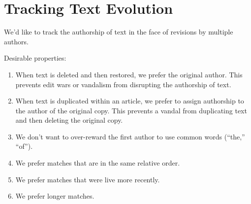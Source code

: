 \section{Tracking Text Evolution}

We'd like to track the authorship of text in the face of revisions
by multiple authors.

Desirable properties:
\begin{enumerate}
\item When text is deleted and then restored, we prefer the original author.
    This prevents edit wars or vandalism from disrupting the
    authorship of text.
\item When text is duplicated within an article, we prefer to assign
    authorship to the author of the original copy.
    This prevents a vandal from duplicating text and then deleting the
    original copy.
\item We don't want to over-reward the first author to use common
    words (\eg ``the,'' ``of'').
\item We prefer matches that are in the same relative order.
\item We prefer matches that were live more recently.
\item We prefer longer matches.
\end{enumerate}

